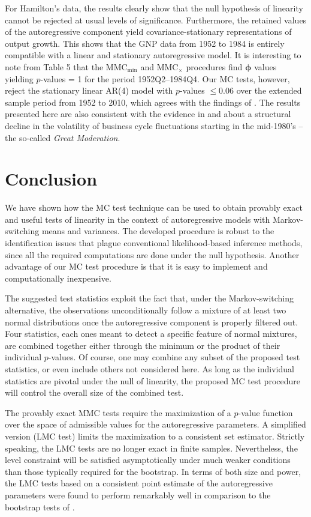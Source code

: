 \documentclass[11pt]{article}
\begin{document}
For Hamilton's data, the results clearly show that the null hypothesis of
linearity cannot be rejected at usual levels of significance. Furthermore,
the retained values of the autoregressive component yield
covariance-stationary representations of output growth. This shows that the
GNP data from 1952 to 1984 is entirely compatible with a linear and
stationary autoregressive model. It is interesting to note from Table 5 that
the MMC$_{\min }$ and MMC$_{\times }$ procedures find $\boldsymbol{\phi }$
values yielding $p$-values = 1 for the period 1952Q2--1984Q4. Our MC tests,
however, reject the stationary linear AR(4) model with $p$-values $\leq 0.06$
over the extended sample period from 1952 to 2010, which agrees with the
findings of \citet{Carrasco-Hu-Ploberger:2014}. The results presented here
are also consistent with the evidence in \citet{Kim-Nelson:1999} and %
\citet{McConnell-Perez-Quiros:2000} about a structural decline in the
volatility of business cycle fluctuations starting in the mid-1980's -- the
so-called \emph{Great Moderation}.

\section{Conclusion}

We have shown how the MC test technique can be used to obtain provably exact
and useful tests of linearity in the context of autoregressive models with
Markov-switching means and variances. The developed procedure is robust to
the identification issues that plague conventional likelihood-based
inference methods, since all the required computations are done under the
null hypothesis. Another advantage of our MC test procedure is that it is
easy to implement and computationally inexpensive.

The suggested test statistics exploit the fact that, under the
Markov-switching alternative, the observations unconditionally follow a
mixture of at least two normal distributions once the autoregressive
component is properly filtered out. Four statistics, each ones meant to
detect a specific feature of normal mixtures, are combined together either
through the minimum or the product of their individual $p$-values. Of
course, one may combine any subset of the proposed test statistics, or even
include others not considered here. As long as the individual statistics are
pivotal under the null of linearity, the proposed MC test procedure will
control the overall size of the combined test.

The provably exact MMC tests require the maximization of a $p$-value
function over the space of admissible values for the autoregressive
parameters. A simplified version (LMC test) limits the maximization to a
consistent set estimator. Strictly speaking, the LMC tests are no longer
exact in finite samples. Nevertheless, the level constraint will be
satisfied asymptotically under much weaker conditions than those typically
required for the bootstrap. In terms of both size and power, the LMC tests
based on a consistent point estimate of the autoregressive parameters were
found to perform remarkably well in comparison to the bootstrap tests of %
\citet{Carrasco-Hu-Ploberger:2014}.
\end{document}
